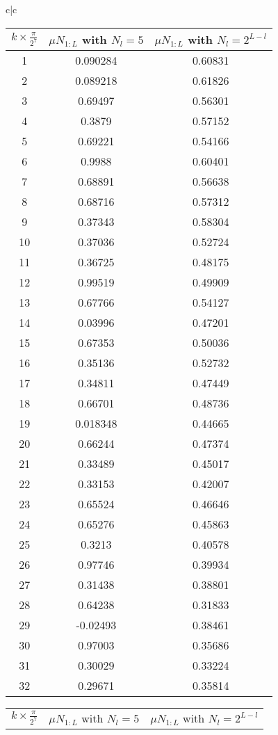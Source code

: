 \begin{tabular}{c|c}

\begin{tabular}{|c|c|c|}
\hline
$k\times\frac{\pi}{2^7}$ & $\mu N_{1:L}$ with $N_l=5$ & $\mu N_{1:L}$ with $N_l=2^{L-l}$ \\ 
\hline 
1 & 0.090284 & 0.60831\\ 
2 & 0.089218 & 0.61826\\ 
3 & 0.69497 & 0.56301\\ 
4 & 0.3879 & 0.57152\\ 
5 & 0.69221 & 0.54166 \\ 
6 & 0.9988 & 0.60401\\ 
7 & 0.68891 & 0.56638 \\ 
8 & 0.68716 & 0.57312\\ 
9 & 0.37343 & 0.58304  \\ 
10 & 0.37036 & 0.52724\\ 
11 & 0.36725 & 0.48175 \\ 
12 & 0.99519 & 0.49909\\ 
13 & 0.67766 & 0.54127\\ 
14 & 0.03996 & 0.47201\\ 
15 & 0.67353 & 0.50036\\ 
16 & 0.35136 & 0.52732\\ 
17 & 0.34811 &0.47449\\ 
18 & 0.66701 &0.48736\\ 
19 & 0.018348 &0.44665\\ 
20 & 0.66244 &0.47374\\ 
21 & 0.33489 &0.45017\\ 
22 & 0.33153 &0.42007\\ 
23 & 0.65524 &0.46646\\ 
24 & 0.65276 &0.45863\\ 
25 & 0.3213 &0.40578\\ 
26 & 0.97746 & 0.39934\\ 
27 & 0.31438 &0.38801\\ 
28 & 0.64238& 0.31833\\ 
29 & -0.02493 &0.38461\\ 
30 & 0.97003 &0.35686\\ 
31 & 0.30029 &0.33224\\ 
32 & 0.29671& 0.35814\\ 
\hline
\end{tabular}
\begin{tabular}{|c|c|c|}
\hline
$k\times\frac{\pi}{2^7}$ & $\mu N_{1:L}$ with $N_l=5$ & $\mu N_{1:L}$ with $N_l=2^{L-l}$ \\ 

\end{tabular}
\end{tabular}
